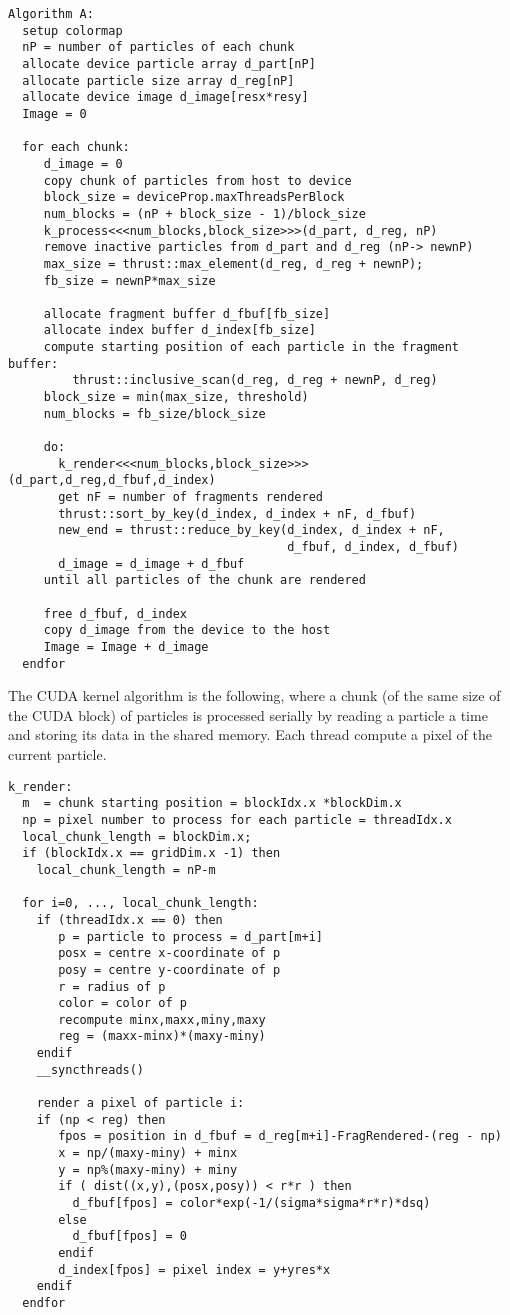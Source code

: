 \documentclass[11pt]{article}
\begin{document}
\small
\begin{verbatim}
Algorithm A:
  setup colormap
  nP = number of particles of each chunk
  allocate device particle array d_part[nP]
  allocate particle size array d_reg[nP]
  allocate device image d_image[resx*resy]
  Image = 0
 
  for each chunk: 
     d_image = 0
     copy chunk of particles from host to device  
     block_size = deviceProp.maxThreadsPerBlock
     num_blocks = (nP + block_size - 1)/block_size
     k_process<<<num_blocks,block_size>>>(d_part, d_reg, nP) 
     remove inactive particles from d_part and d_reg (nP-> newnP) 
     max_size = thrust::max_element(d_reg, d_reg + newnP);
     fb_size = newnP*max_size

     allocate fragment buffer d_fbuf[fb_size]
     allocate index buffer d_index[fb_size]
     compute starting position of each particle in the fragment buffer:  
         thrust::inclusive_scan(d_reg, d_reg + newnP, d_reg)         
     block_size = min(max_size, threshold)
     num_blocks = fb_size/block_size

     do:
       k_render<<<num_blocks,block_size>>>(d_part,d_reg,d_fbuf,d_index)  
       get nF = number of fragments rendered 
       thrust::sort_by_key(d_index, d_index + nF, d_fbuf)
       new_end = thrust::reduce_by_key(d_index, d_index + nF, 
                                       d_fbuf, d_index, d_fbuf) 
       d_image = d_image + d_fbuf
     until all particles of the chunk are rendered
     
     free d_fbuf, d_index
     copy d_image from the device to the host
     Image = Image + d_image
  endfor

\end{verbatim}
\normalsize
The CUDA kernel algorithm is the following, where a chunk (of the same size of the CUDA block) of particles is processed serially by reading a particle a time and storing its data in the shared memory. Each thread compute a pixel of the current particle. 
\small
\begin{verbatim}
k_render:
  m  = chunk starting position = blockIdx.x *blockDim.x
  np = pixel number to process for each particle = threadIdx.x
  local_chunk_length = blockDim.x;
  if (blockIdx.x == gridDim.x -1) then
    local_chunk_length = nP-m

  for i=0, ..., local_chunk_length:
    if (threadIdx.x == 0) then
       p = particle to process = d_part[m+i]
       posx = centre x-coordinate of p
       posy = centre y-coordinate of p
       r = radius of p
       color = color of p
       recompute minx,maxx,miny,maxy
       reg = (maxx-minx)*(maxy-miny)
    endif
    __syncthreads()

    render a pixel of particle i:
    if (np < reg) then
       fpos = position in d_fbuf = d_reg[m+i]-FragRendered-(reg - np)
       x = np/(maxy-miny) + minx
       y = np%(maxy-miny) + miny
       if ( dist((x,y),(posx,posy)) < r*r ) then
         d_fbuf[fpos] = color*exp(-1/(sigma*sigma*r*r)*dsq)
       else 
         d_fbuf[fpos] = 0
       endif
       d_index[fpos] = pixel index = y+yres*x
    endif
  endfor
\end{verbatim}
\end{document}
